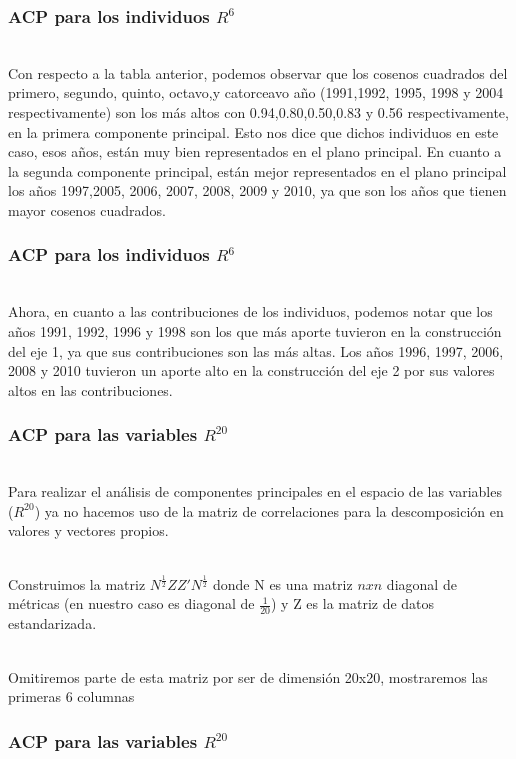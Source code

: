 \documentclass[12pt]{beamer}
\newcommand\Wider[2][3em]{%
\makebox[\linewidth][c]{%
  \begin{minipage}{\dimexpr\textwidth+#1\relax}
  \raggedright#2
  \end{minipage}%
  }%
}
\begin{document}
\begin{frame}
\frametitle{ACP para los individuos $R^6$}
~\\Con respecto a la tabla anterior, podemos observar que los cosenos cuadrados del primero, segundo, quinto, octavo,y catorceavo año (1991,1992, 1995, 1998 y 2004 respectivamente) son los más altos con 0.94,0.80,0.50,0.83 y 0.56 respectivamente, en la primera componente principal. Esto nos dice que dichos individuos en este caso, esos años, están muy bien representados en el plano principal. En cuanto a la segunda componente principal, están mejor representados en el plano principal los años 1997,2005, 2006, 2007, 2008, 2009 y 2010, ya que son los años que tienen mayor cosenos cuadrados.
\end{frame}

\begin{frame}
\frametitle{ACP para los individuos $R^6$}
~\\Ahora, en cuanto a las contribuciones de los individuos, podemos notar que los años 1991, 1992, 1996 y 1998 son los que más aporte tuvieron en la construcción del eje 1, ya que sus contribuciones son las más altas. Los años 1996, 1997, 2006, 2008 y 2010 tuvieron un aporte alto en la construcción del eje 2 por sus valores altos en las contribuciones.
\end{frame}

\begin{frame}
\frametitle{ACP para las variables $R^{20}$}
~\\Para realizar el análisis de componentes principales en el espacio de las variables ($R^20$) ya no hacemos uso de la matriz de correlaciones para la descomposición en valores y vectores propios. 

~\\Construimos la matriz $N^{\frac{1}{2}}ZZ'N^{\frac{1}{2}}$ donde N es una matriz $nxn$ diagonal de métricas (en nuestro caso es diagonal de $\frac{1}{20}$) y Z es la matriz de datos estandarizada.

~\\Omitiremos parte de esta matriz por ser de dimensión 20x20, mostraremos las primeras 6 columnas
\end{frame}

\begin{frame}
\frametitle{ACP para las variables $R^{20}$}
\Wider[4em]{
\begin{figure}[!h]
    \begin{center}
        \texttt{[image: imagenes/N.png]}
        \label{figura1}
    \end{center}
\end{figure}
}
\end{frame}
\end{document}
